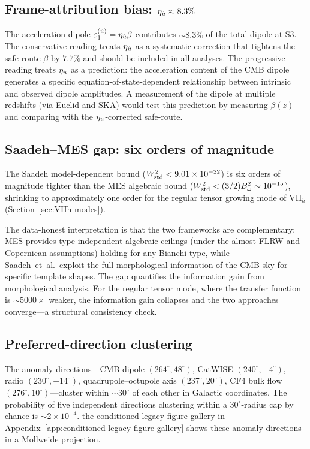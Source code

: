 \subsection{Frame-attribution bias: $\eta_{\dot{u}} \approx 8.3\%$}

The acceleration dipole
$\varepsilon_1^{(\dot{u})} = \eta_{\dot{u}}\beta$ contributes $\sim 8.3\%$
of the total dipole at S3.  The conservative reading treats
$\eta_{\dot{u}}$ as a systematic correction that tightens the
safe-route $\beta$ by $7.7\%$ and should be included in all
analyses.  The progressive reading treats $\eta_{\dot{u}}$ as a
prediction: the acceleration content of the CMB dipole
generates a specific equation-of-state-dependent relationship
between intrinsic and observed dipole amplitudes.  A measurement
of the dipole at multiple redshifts (via Euclid and SKA) would
test this prediction by measuring $\beta(z)$ and comparing with
the $\eta_{\dot{u}}$-corrected safe-route.


\subsection{Saadeh--MES gap: six orders of magnitude}

The Saadeh model-dependent bound
($W^2_{\mathrm{std}} < 9.01 \times 10^{-22}$) is six orders of magnitude
tighter than the MES algebraic bound
($W^2_{\mathrm{std}} < (3/2)B_\omega^2 \sim 10^{-15}$), shrinking to
approximately one order for the regular tensor growing mode of
VII$_h$ (Section~\ref{sec:VIIh-modes}).

The data-honest interpretation is that the two frameworks are
complementary: MES provides type-independent algebraic ceilings
(under the almost-FLRW and Copernican assumptions)
holding for any Bianchi type, while Saadeh~et~al.\ exploit the
full morphological information of the CMB sky for specific
template shapes.  The gap quantifies the information gain from
morphological analysis.  For the regular tensor mode, where the
transfer function is $\sim 5000\times$ weaker, the information
gain collapses and the two approaches converge---a structural
consistency check.


\subsection{Preferred-direction clustering}

The anomaly directions---CMB dipole $(264^\circ, 48^\circ)$,
CatWISE $(240^\circ, -4^\circ)$, radio
$(230^\circ, -14^\circ)$, quadrupole--octupole axis
$(237^\circ, 20^\circ)$, CF4 bulk flow
$(276^\circ, 10^\circ)$---cluster within $\sim 30^\circ$ of
each other in Galactic coordinates.  The probability of five
independent directions clustering within a $30^\circ$-radius
cap by chance is $\sim 2 \times 10^{-4}$.
the conditioned legacy figure gallery in Appendix~\ref{app:conditioned-legacy-figure-gallery} shows these anomaly directions
in a Mollweide projection.

